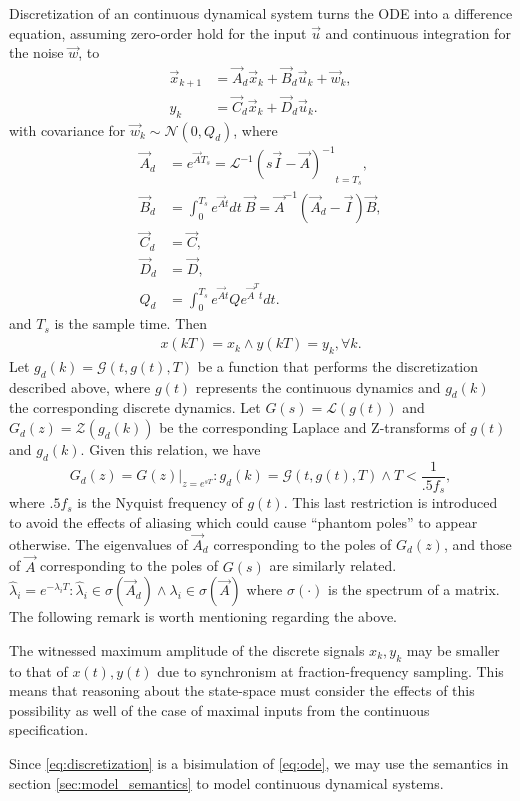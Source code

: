 \documentclass[runningheads,a4paper]{llncs}
\begin{document}
Discretization of an continuous dynamical system turns the ODE into a difference equation, assuming zero-order hold
for the input $\vec{u}$ and continuous integration for the noise $\vec{w}$, to
\begin{align}
\label{eq:discretization}
\vec{x}_{k+1} &= \vec{A}_d\vec{x}_k+\vec{B}_d\vec{u}_k + \vec{w}_k,\\
y_k &= \vec{C}_d \vec{x}_ k + \vec{D}_d \vec{u}_ k. 
\end{align}
with covariance for $\vec{w}_k \sim \mathcal{N}(0,Q_d)$,
where
\begin{align}
\label{eq:discretize}
\vec{A}_d &= e^{\vec{A} T_s} = \mathcal{L}^{-1} { ( s \vec{I} - \vec{A} )^{-1} }_{t = T_s},\\
\vec{B}_d &= \int_{0}^{T_s} e^{\vec{A} t} dt\ \vec{B} = \vec{A}^{-1} ( \vec{A}_d - \vec{I} ) \vec{B},\\
\vec{C}_d &= \vec{C},\\
\vec{D}_d &= \vec{D},\\
Q_d &= \int_{0}^{T_s} e^{\vec{A} t} Q e^{\vec{A}^T t} dt.
\end{align}
and $T_s$ is the sample time. Then
\begin{align*}
x(kT)=x_k \wedge y(kT) = y_k, \forall k.
\end{align*}
Let $g_d(k)=\mathcal{G}(t,g(t),T)$ be a function that performs the discretization described above, where $g(t)$
represents the continuous dynamics and $g_d(k)$ the corresponding discrete dynamics. 
Let $G(s)=\mathcal{L}(g(t))$ and $G_d(z)=\mathcal{Z}(g_d(k))$ be the corresponding Laplace and Z-transforms
of $g(t)$ and $g_d(k)$. Given this relation, we have 
$$G_d(z)=G(z)|_{z=e^{sT}} : g_d(k)=\mathcal{G}(t,g(t),T) \wedge T < \frac{1}{.5f_s},$$
where $.5f_s$ is the Nyquist frequency of $g(t)$. This last restriction is introduced to avoid the effects of aliasing
which could cause ``phantom poles'' to appear otherwise. 
The eigenvalues of $\vec{A}_d$ corresponding to the poles of $G_d(z)$, and those of $\vec{A}$ corresponding to the poles of $G(s)$ are similarly related.
$\hat{\lambda}_i=e^{-\lambda_iT} : \hat{\lambda}_i \in \sigma(\vec{A}_d) \wedge \lambda_i \in \sigma(\vec{A})$
where $\sigma(\cdot)$ is the spectrum of a matrix.
The following remark is worth mentioning regarding the above.
\begin{remark}
The witnessed maximum amplitude of the discrete signals $x_k,y_k$ may be smaller to that of $x(t),y(t)$ due to synchronism at fraction-frequency sampling.
This means that reasoning about the state-space must consider the effects of this possibility as well of the case of maximal inputs from the continuous specification.
\end{remark}
 Since \eqref{eq:discretization} is a bisimulation of \eqref{eq:ode}, we may use the semantics in section \ref{sec:model_semantics} to model continuous dynamical systems.
\end{document}
